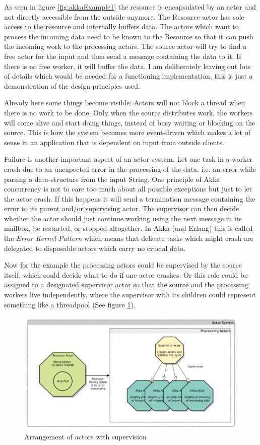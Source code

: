 \documentclass[11p]{scrartcl}
\begin{document}
As seen in figure \ref{fig:akkaExample1} the resource is encapsulated by an actor and not directly accessible from the outside anymore. The Resource actor has sole access to the resource and internally buffers data. The actors which want to process the incoming data need to be known to the Resource so that it can push the incoming work to the processing actors. The source actor will try to find a free actor for the input and then send a message containing the data to it. If there is no free worker, it will buffer the data. I am deliberately leaving out lots of details which would be needed for a functioning implementation, this is just a demonstration of the design principles used.

Already here some things become visible: Actors will not block a thread when there is no work to be done. Only when the source distributes work, the workers will come alive and start doing things, instead of busy waiting or blocking on the source. This is how the system becomes more event-driven which makes a lot of sense in an application that is dependent on input from outside clients.

Failure is another important aspect of an actor system. Let one task in a worker crash due to an unexpected error in the processing of the data, i.e. an error while parsing a data-structure from the input String. One principle of Akka concurrency is not to care too much about all possible exceptions but just to let the actor crash. If this happens it will send a termination message containing the error to its parent and/or supervising actor. 
The supervisor can then decide whether the actor should just continue working using the next message in its mailbox, be restarted, or stopped altogether.
In Akka (and Erlang) this is called the \textit{Error Kernel Pattern} which means that delicate tasks which might crash are delegated to disposable actors which carry no crucial data.

Now for the example the processing actors could be supervised by the source itself, which could decide what to do if one actor crashes. Or this role could be assigned to a designated supervisor actor so that the source and the processing workers live independently, where the supervisor with its children could represent something like a threadpool (See figure \ref{fig:akkaExample2}).

\begin{figure}[h]		
 	\includegraphics[scale=0.4]{figures/akkaExample2.png}
	\caption{Arrangement of actors with supervision}
	\label{fig:akkaExample2}
\end{figure}
\end{document}
